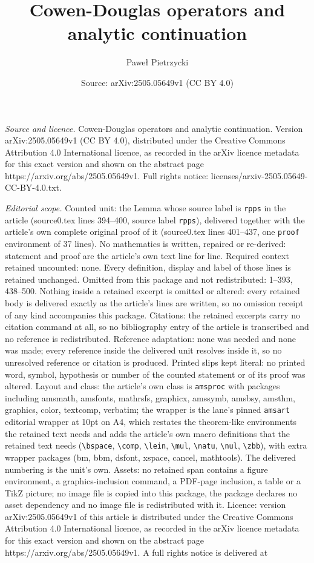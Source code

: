 \documentclass[10pt,a4paper]{amsart}
\title[Cowen-Douglas operators and analytic continuation]{Cowen-Douglas operators and analytic continuation}
\author{Pawe{\l} Pietrzycki}
\date{Source: arXiv:2505.05649v1 (CC BY 4.0)}
\begin{document}
\maketitle

\noindent\emph{Source and licence.} Cowen-Douglas operators and analytic continuation. Version arXiv:2505.05649v1 (CC BY 4.0), distributed under the Creative Commons Attribution 4.0 International licence, as recorded in the arXiv licence metadata for this exact version and shown on the abstract page https://arxiv.org/abs/2505.05649v1. Full rights notice: licenses/arxiv-2505.05649-CC-BY-4.0.txt.\par\smallskip

\noindent\textit{Editorial scope.} Counted unit: the Lemma whose source label is \texttt{rpps} in the article (source0.tex lines 394--400, source label \texttt{rpps}), delivered together with the article's own complete original proof of it (source0.tex lines 401--437, one \texttt{proof} environment of 37 lines). No mathematics is written, repaired or re-derived: statement and proof are the article's own text line for line. Required context retained uncounted: none. Every definition, display and label of those lines is retained unchanged. Omitted from this package and not redistributed: 1--393, 438--500. Nothing inside a retained excerpt is omitted or altered: every retained body is delivered exactly as the article's lines are written, so no omission receipt of any kind accompanies this package. Citations: the retained excerpts carry no citation command at all, so no bibliography entry of the article is transcribed and no reference is redistributed. Reference adaptation: none was needed and none was made; every reference inside the delivered unit resolves inside it, so no unresolved reference or citation is produced. Printed slips kept literal: no printed word, symbol, hypothesis or number of the counted statement or of its proof was altered. Layout and class: the article's own class is \texttt{amsproc} with packages including amsmath, amsfonts, mathrsfs, graphicx, amssymb, amsbsy, amsthm, graphics, color, textcomp, verbatim; the wrapper is the lane's pinned \texttt{amsart} editorial wrapper at 10pt on A4, which restates the theorem-like environments the retained text needs and adds the article's own macro definitions that the retained text needs (\texttt{\textbackslash bspace}, \texttt{\textbackslash comp}, \texttt{\textbackslash lein}, \texttt{\textbackslash mul}, \texttt{\textbackslash natu}, \texttt{\textbackslash nul}, \texttt{\textbackslash zbb}), with extra wrapper packages (bm, bbm, dsfont, xspace, cancel, mathtools). The delivered numbering is the unit's own. Assets: no retained span contains a figure environment, a graphics-inclusion command, a PDF-page inclusion, a table or a TikZ picture; no image file is copied into this package, the package declares no asset dependency and no image file is redistributed with it. Licence: version arXiv:2505.05649v1 of this article is distributed under the Creative Commons Attribution 4.0 International licence, as recorded in the arXiv licence metadata for this exact version and shown on the abstract page https://arxiv.org/abs/2505.05649v1. A full rights notice is delivered at 
\end{document}
